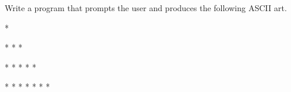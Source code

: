 Write a program that prompts the user and produces the following ASCII art.

\resett
\nextt
\begin{console}[commandchars=\\\{\}]
*
\end{console}
 
\nextt
\begin{console}[commandchars=\\\{\}]
* *
 *
\end{console}

\nextt
\begin{console}[commandchars=\\\{\}]
*   *
 * *
  *
\end{console}

\nextt
\begin{console}[commandchars=\\\{\}]
*     *
 *   *
  * *
   *
\end{console}
